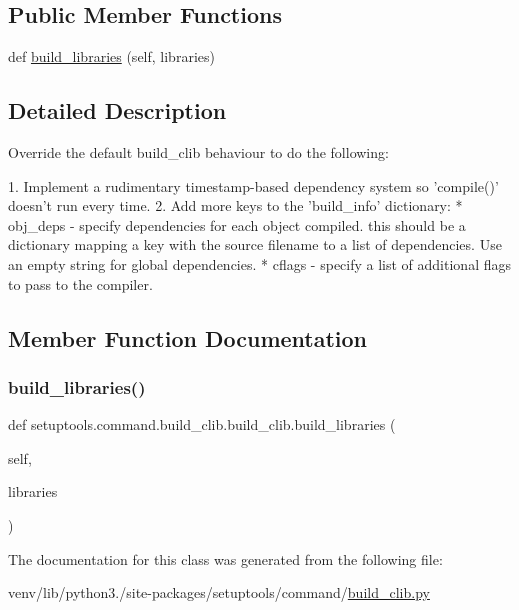 \subsection*{Public Member Functions}
\begin{DoxyCompactItemize}
\item 
def \hyperlink{classsetuptools_1_1command_1_1build__clib_1_1build__clib_a0f23e07ecec40a09f77d20205db47ae8}{build\+\_\+libraries} (self, libraries)
\end{DoxyCompactItemize}


\subsection{Detailed Description}
\begin{DoxyVerb}Override the default build_clib behaviour to do the following:

1. Implement a rudimentary timestamp-based dependency system
   so 'compile()' doesn't run every time.
2. Add more keys to the 'build_info' dictionary:
    * obj_deps - specify dependencies for each object compiled.
                 this should be a dictionary mapping a key
                 with the source filename to a list of
                 dependencies. Use an empty string for global
                 dependencies.
    * cflags   - specify a list of additional flags to pass to
                 the compiler.
\end{DoxyVerb}
 

\subsection{Member Function Documentation}
\mbox{\label{classsetuptools_1_1command_1_1build__clib_1_1build__clib_a0f23e07ecec40a09f77d20205db47ae8}} 
\subsubsection{\texorpdfstring{build\+\_\+libraries()}{build\_libraries()}}
{\footnotesize\ttfamily def setuptools.\+command.\+build\+\_\+clib.\+build\+\_\+clib.\+build\+\_\+libraries (\begin{DoxyParamCaption}\item[{}]{self,  }\item[{}]{libraries }\end{DoxyParamCaption})}



The documentation for this class was generated from the following file\+:\begin{DoxyCompactItemize}
\item 
venv/lib/python3./site-\/packages/setuptools/command/\hyperlink{setuptools_2command_2build__clib_8py}{build\+\_\+clib.\+py}\end{DoxyCompactItemize}
